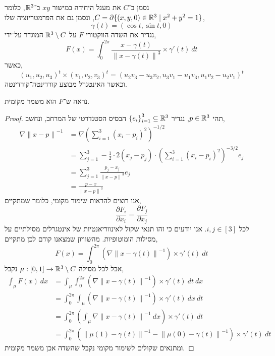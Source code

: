 \question{}
נסמן ב־$C$ את מעגל היחידה במישור $xy$ ב־$\mathbb{R}^3$, כלומר $C = \partial \{ (x, y, 0) \in \mathbb{R}^3 \mid x^2 + y^2 = 1 \}$,
ונסמן גם את הפרמטריזציה שלו,
\[
	\gamma(t)
	= (\cos t, \sin t, 0)
\]
נגדיר את השדה הווקטורי $F$ על $\mathbb{R}^3 \setminus C$ המוגדר על־ידי,
\[
	F(x)
	= \int_{0}^{2 \pi} \frac{x - \gamma(t)}{{\lVert x - \gamma(t) \rVert}^3} \times \gamma'(t)\ dt
\]
כאשר,
\[
	{(u_1, u_2, u_3)}^t \times {(v_1, v_2, v_3)}^t
	= {(u_2 v_3 - u_3 v_2, u_3 v_1 - u_1 v_3, u_1 v_2 - u_2 v_1)}^t
\]
וכאשר האינטגרל מבוצע קורדינטה־קורדינטה.

\subquestion{}
נראה ש־$F$ הוא משמר מקומית.
\begin{proof}
	תהי $p \in \mathbb{R}^3$, נגדיר ${\{ e_i \}}_{i = 1}^3 \subseteq \mathbb{R}^3$ הבסיס הסטנדרטי של המרחב, ונחשב,
	\begin{align*}
		\nabla {\lVert x - p \rVert}^{-1}
		& = \nabla {\left(\sum_{i = 1}^3 {(x_i - p_i)}^2 \right)}^{-1/2} \\
		& = \sum_{j = 1}^3 - \frac{1}{2} \cdot 2 (x_j - p_j) \cdot {\left(\sum_{i = 1}^3 {(x_i - p_i)}^2 \right)}^{-3/2} e_j \\
		& = \sum_{j = 1}^3 \frac{p_j - x_j}{{\lVert x - p \rVert}^3} e_j \\
		& = \frac{p - x}{{\lVert x - p \rVert}^3}
	\end{align*}
	אנו רוצים להראות שימור מקומי, כלומר שמתקיים,
	\[
		\frac{\partial F_i}{\partial x_i}
		= \frac{\partial F_j}{\partial x_j}
	\]
	לכל $i, j \in [3]$.
	אנו יודעים כי זהו תנאי שקול לאינווריאנטיות של אינטגרלים מסילתיים על מסילות הומוטופיות.
	מהשוויון שמצאנו קודם לכן מתקיים,
	\[
		F(x)
		= \int_{0}^{2 \pi} (\nabla {\lVert x - \gamma(t) \rVert}^{-1}) \times \gamma'(t)\ dt
	\]
	אבל לכל מסילה $\mu : [0, 1] \to \mathbb{R}^3 \setminus C$ נקבל,
	\begin{align*}
		\int_{\mu} F(x)\ dx
		& = \int_{\mu} \int_{0}^{2 \pi} (\nabla {\lVert x - \gamma(t) \rVert}^{-1}) \times \gamma'(t)\ dt\ dx \\
		& = \int_{0}^{2 \pi} \int_{\mu} (\nabla {\lVert x - \gamma(t) \rVert}^{-1}) \times \gamma'(t)\ dx\ dt \\
		& = \int_{0}^{2 \pi} \left(\int_{\mu} \nabla {\lVert x - \gamma(t) \rVert}^{-1}\ dx\right) \times \gamma'(t)\ dt \\
		& = \int_{0}^{2 \pi} \left({\lVert \mu(1) - \gamma(t) \rVert}^{-1} - {\lVert \mu(0) - \gamma(t) \rVert}^{-1}\right) \times \gamma'(t)\ dt
	\end{align*}
	ומתנאים שקולים לשימור מקומי נקבל שהשדה אכן משמר מקומית.
\end{proof}

